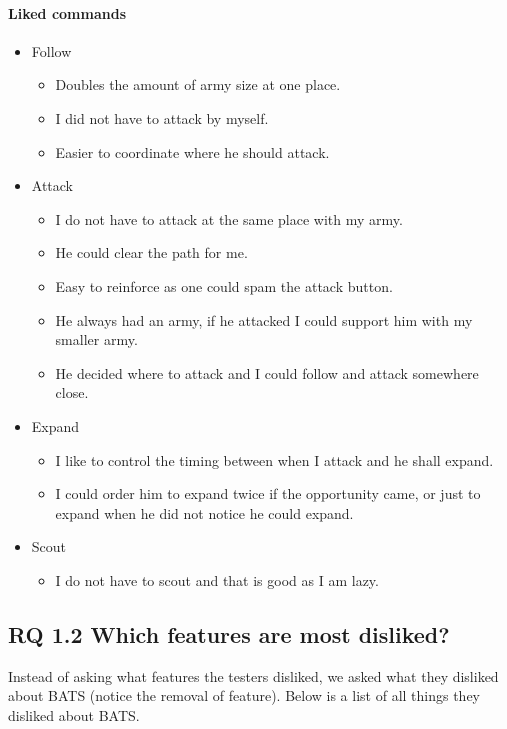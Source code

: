 \paragraph{Liked commands}
\begin{itemize}
	\item Follow
	\begin{itemize}
		\item Doubles the amount of army size at one place.
		\item I did not have to attack by myself.
		\item Easier to coordinate where he should attack.
	\end{itemize}
	\item Attack
	\begin{itemize}
		\item I do not have to attack at the same place with my army.
		\item He could clear the path for me.
		\item Easy to reinforce as one could spam the attack button.
		\item He always had an army, if he attacked I could support him with my smaller army.
		\item He decided where to attack and I could follow and attack somewhere close.
	\end{itemize}
	\item Expand
	\begin{itemize}
		\item I like to control the timing between when I attack and he shall expand.
		\item I could order him to expand twice if the opportunity came, or just to expand when he did not notice he could expand.
	\end{itemize}
	\item Scout
	\begin{itemize}
		\item I do not have to scout and that is good as I am lazy.
	\end{itemize}
\end{itemize}

\subsection{RQ 1.2 Which features are most disliked?}
Instead of asking what features the testers disliked, we asked what they disliked about BATS (notice
the removal of feature). Below is a list of all things they disliked about BATS.
